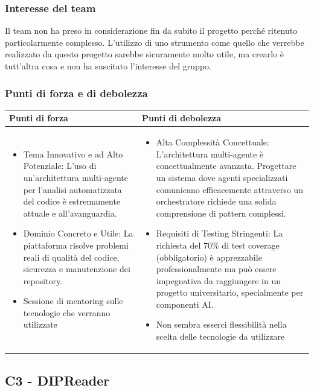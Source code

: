 \documentclass[a4paper,11pt]{article}
\begin{document}
\subsubsection{Interesse del team}
Il team non ha preso in considerazione fin da subito il progetto perché ritenuto particolarmente complesso. L’utilizzo di uno strumento come quello che verrebbe realizzato da questo progetto sarebbe sicuramente molto utile, ma crearlo è tutt’altra cosa e non ha suscitato l’interesse del gruppo.
\subsubsection{Punti di forza e di debolezza}
{\footnotesize
\begin{tabularx}{\textwidth}{|X|X|}
\hline
\rowcolor{lightgray!40} %
\textbf{Punti di forza} & \textbf{Punti di debolezza} \\
\hline
\begin{itemize}
\item Tema Innovativo e ad Alto Potenziale: L'uso di un'architettura multi-agente per l'analisi automatizzata del codice è estremamente attuale e all'avanguardia.
\item Dominio Concreto e Utile: La piattaforma risolve problemi reali di qualità del codice, sicurezza e manutenzione dei repository. 
\item Sessione di mentoring sulle tecnologie che verranno utilizzate
\end{itemize}
 & \begin{itemize}
\item Alta Complessità Concettuale: L'architettura multi-agente è concettualmente avanzata. Progettare un sistema dove agenti specializzati comunicano efficacemente attraverso un orchestratore richiede una solida comprensione di pattern complessi.
\item  Requisiti di Testing Stringenti: La richiesta del 70\% di test coverage (obbligatorio) è apprezzabile professionalmente ma può essere impegnativa da raggiungere in un progetto universitario, specialmente per componenti AI.
\item Non sembra esserci flessibilità nella scelta delle tecnologie da utilizzare
\end{itemize} \\
\hline
\end{tabularx}
}

\newpage
\subsection{C3 - DIPReader}
\end{document}

